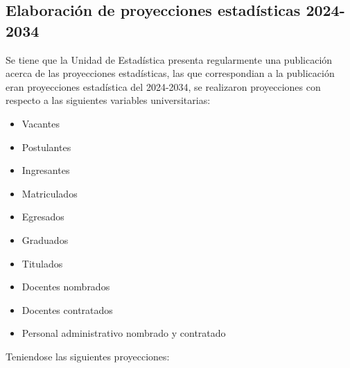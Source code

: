 \documentclass[
  12pt,
  letterpaper,
]{scrreprt}
\providecommand{\tightlist}{%
  \setlength{\itemsep}{0pt}\setlength{\parskip}{0pt}}\usepackage{longtable,booktabs,array}
\begin{document}
\subsection{Elaboración de proyecciones estadísticas
2024-2034}\label{elaboraciuxf3n-de-proyecciones-estaduxedsticas-2024-2034}

Se tiene que la Unidad de Estadística presenta regularmente una
publicación acerca de las proyecciones estadísticas, las que
correspondian a la publicación eran proyecciones estadística del
2024-2034, se realizaron proyecciones con respecto a las siguientes
variables universitarias:

\begin{itemize}
\tightlist
\item
  Vacantes
\item
  Postulantes
\item
  Ingresantes
\item
  Matriculados
\item
  Egresados
\item
  Graduados
\item
  Titulados
\item
  Docentes nombrados
\item
  Docentes contratados
\item
  Personal administrativo nombrado y contratado
\end{itemize}

Teniendose las siguientes proyecciones:
\end{document}
